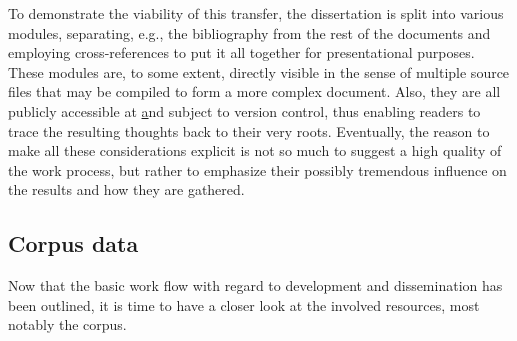 \documentclass[jou]{apa6} %
\begin{document}
To demonstrate the viability of this transfer, the dissertation is split into various modules, separating, e.g., the bibliography from the rest of the documents and employing cross-references to put it all together for presentational purposes. These modules are, to some extent, directly visible in the sense of multiple source files that may be compiled to form a more complex document. Also, they are all publicly accessible at \href{https://github.com/konstantinschulz/asrael} and subject to version control, thus enabling readers to trace the resulting thoughts back to their very roots. Eventually, the reason to make all these considerations explicit is not so much to suggest a high quality of the work process, but rather to emphasize their possibly tremendous influence on the results and how they are gathered.

\subsection{Corpus data}

Now that the basic work flow with regard to development and dissemination has been outlined, it is time to have a closer look at the involved resources, most notably the corpus. 

\printbibliography
\end{document}
